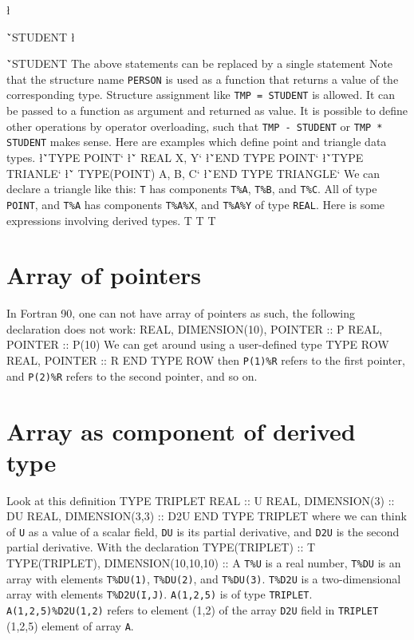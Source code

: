 \l{\v`STUDENT%
\l{\v`STUDENT%
\sms
The above statements can be replaced by a single statement
\sms
{}
\sms
Note that the structure name {\tt PERSON} is used as a function that
returns a value of the corresponding type. 
Structure assignment like {\tt TMP = STUDENT} is allowed. It can be
passed to a function as argument and returned as value.  It is possible
to define other operations by operator overloading, such that
{\tt TMP - STUDENT} or {\tt TMP * STUDENT} makes sense.
Here are examples which define point and triangle data types.
\sms
\l{\v`TYPE POINT`}
\l{\v`   REAL X, Y`\m{}}
\l{\v`END TYPE POINT`\m{}}
\sms
\l{\v`TYPE TRIANLE`}
\l{\v`   TYPE(POINT) A, B, C`\m{}}
\l{\v`END TYPE TRIANGLE`\m{}}
\sms
We can declare a triangle like this:
\sms
{}
\sms
{\tt T} has components {\tt T\%A}, {\tt T\%B}, and {\tt T\%C}. All
of type {\tt POINT}, and {\tt T\%A} has components {\tt T\%A\%X},
and {\tt T\%A\%Y} of type {\tt REAL}. Here is some expressions involving
derived types.
\ttbg
T%
T%
T%
\tted

\section{Array of pointers}
In Fortran 90, one can not have array of pointers as such, the following
declaration does not work:
\ttbg
REAL, DIMENSION(10), POINTER :: P
REAL, POINTER :: P(10)
\tted
We can get around using a user-defined type
\ttbg
TYPE ROW
   REAL, POINTER :: R
END TYPE ROW
\tted
{}
\sms
then {\tt P(1)\%R} refers to the first pointer, and 
{\tt P(2)\%R} refers to the second pointer, and so on.

\section{Array as component of derived type}
Look at this definition
\ttbg
TYPE TRIPLET
   REAL :: U
   REAL, DIMENSION(3) :: DU
   REAL, DIMENSION(3,3) :: D2U
END TYPE TRIPLET
\tted
where we can think of {\tt U} as a value of a scalar field, {\tt DU}
is its partial derivative, and {\tt D2U} is the second partial
derivative. With the declaration
\ttbg
TYPE(TRIPLET) :: T
TYPE(TRIPLET), DIMENSION(10,10,10) :: A
\tted
{\tt T\%U} is a real number, {\tt T\%DU} is an array with elements
{\tt T\%DU(1)},  {\tt T\%DU(2)},  and {\tt T\%DU(3)}. {\tt T\%D2U}
is a two-dimensional array with elements {\tt T\%D2U(I,J)}. 
{\tt A(1,2,5)} is of type {\tt TRIPLET}.  {\tt A(1,2,5)\%D2U(1,2)}
refers to element (1,2) of the array {\tt D2U} field in {\tt TRIPLET}
(1,2,5) element of array {\tt A}. 

}}
